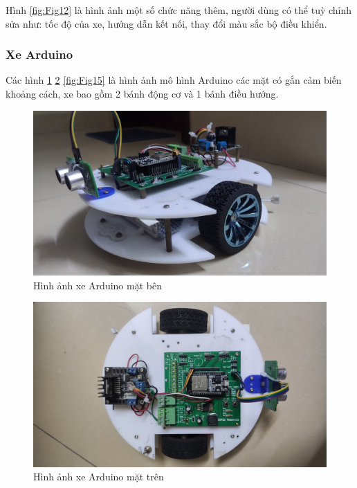 \documentclass[../DoAn.tex]{subfiles}
\begin{document}
Hình \ref{fig:Fig12} là hình ảnh một số chức năng thêm, người dùng có thể tuỳ chỉnh sửa như: tốc độ của xe, hướng dẫn kết nối, thay đổi màu sắc bộ điều khiển.

\subsubsection{Xe Arduino}

Các hình \ref{fig:Fig13} \ref{fig:Fig14} \ref{fig:Fig15} là hình ảnh mô hình Arduino các mặt có gắn cảm biến khoảng cách, xe bao gồm 2 bánh động cơ và 1 bánh điều hướng.

\begin{figure}[H]
    \centering
    \includegraphics[scale = 0.15]{Hinhve/car_1.jpg}
    \caption{Hình ảnh xe Arduino mặt bên}
    \label{fig:Fig13}
\end{figure}

\begin{figure}[H]
    \centering
    \includegraphics[scale = 0.15]{Hinhve/car_2.jpg}
    \caption{Hình ảnh xe Arduino mặt trên}
    \label{fig:Fig14}
\end{figure}
\end{document}
